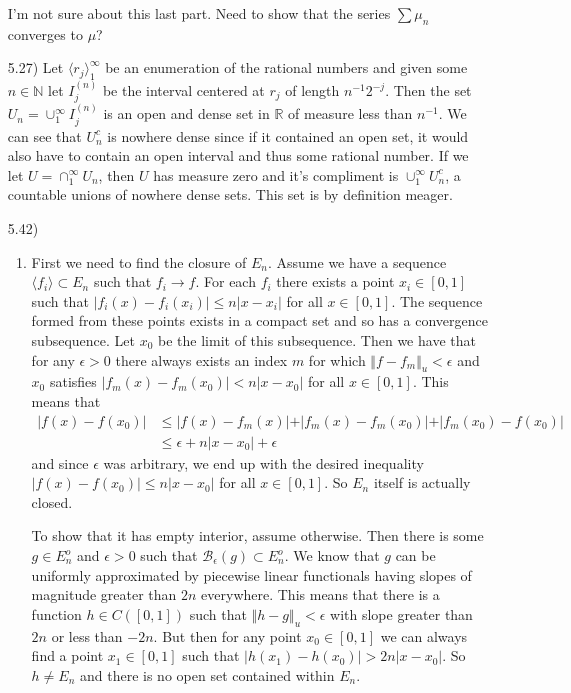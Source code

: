 \documentclass[11pt,letter]{article}
\begin{document}
\begin{enumerate}
    I'm not sure about this last part. Need to show that the series $\sum \mu_n$ converges to $\mu$?

    \item[5.27)] Let $\langle r_j \rangle_1^\infty$ be an enumeration of the rational numbers and given some $n \in \mathbb N$ let $I_j^{(n)}$ be the interval centered at $r_j$ of length $n^{-1}2^{-j}$. Then the set $U_n = \cup_1^\infty I_j^{(n)}$ is an open and dense set in $\mathbb R$ of measure less than $n^{-1}$. We can see that $U_n^c$ is nowhere dense since if it contained an open set, it would also have to contain an open interval and thus some rational number. If we let $U = \cap_1^\infty U_n$, then $U$ has measure zero and it's compliment is $\cup_1^\infty U_n^c$, a countable unions of nowhere dense sets. This set is by definition meager.
         
    \item[5.42)] \begin{enumerate}
        \item First we need to find the closure of $E_n$. Assume we have a sequence $\langle f_i \rangle \subset E_n$ such that $f_i \rightarrow f$. For each $f_i$ there exists a point $x_i \in [0,1]$ such that $\vert f_i(x) - f_i(x_i) \vert \le n \vert x - x_i \vert$ for all $x \in [0,1]$. The sequence formed from these points exists in a compact set and so has a convergence subsequence. Let $x_0$ be the limit of this subsequence. Then we have that for any $\epsilon > 0$ there always exists an index $m$ for which $\Vert f - f_m \Vert_u < \epsilon$ and $x_0$ satisfies $\vert f_m(x) - f_m(x_0) \vert < n \vert x - x_0 \vert$ for all $x \in [0,1]$. This means that
        \begin{align*}
            \vert f(x) - f(x_0) \vert & \le \vert f(x) - f_m(x) \vert + \vert f_m(x) - f_m(x_0) \vert + \vert f_m(x_0) - f(x_0) \vert \\
            & \le \epsilon + n \vert x - x_0 \vert + \epsilon
        \end{align*}
        and since $\epsilon$ was arbitrary, we end up with the desired inequality $\vert f(x) - f(x_0) \vert \le n \vert x - x_0 \vert$ for all $x \in [0,1]$. So $E_n$ itself is actually closed.

        To show that it has empty interior, assume otherwise. Then there is some $g \in E_n^o$ and $\epsilon > 0$ such that $\mathcal{B}_\epsilon(g) \subset E_n^o$. We know that $g$ can be uniformly approximated by piecewise linear functionals having slopes of magnitude greater than $2n$ everywhere. This means that there is a function $h \in C([0,1])$ such that $\Vert h - g \Vert_u < \epsilon$ with slope greater than $2n$ or less than $-2n$. But then for any point $x_0 \in [0,1]$ we can always find a point $x_1 \in [0,1]$ such that $\vert h(x_1) - h(x_0) \vert > 2n \vert x - x_0 \vert$. So $h \ne E_n$ and there is no open set contained within $E_n$.
        

\end{enumerate}
\end{enumerate}
\end{document}
